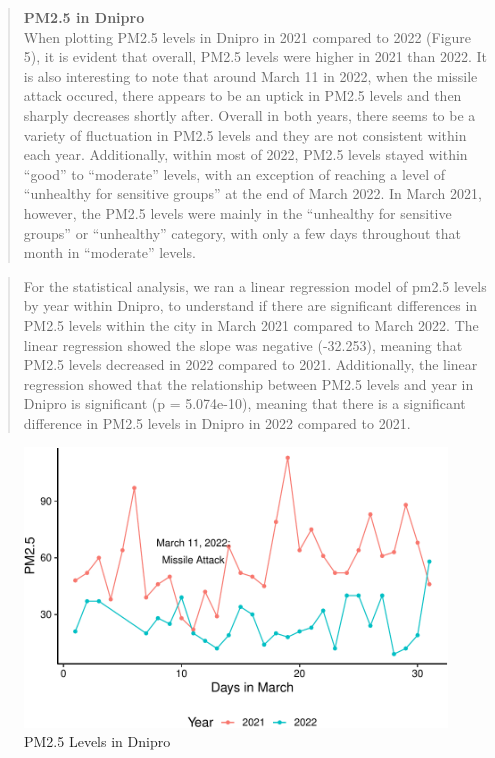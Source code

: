 \documentclass[
  12pt,
]{article}
\begin{document}
\begin{quote}
\textbf{PM2.5 in Dnipro}\\
When plotting PM2.5 levels in Dnipro in 2021 compared to 2022 (Figure
5), it is evident that overall, PM2.5 levels were higher in 2021 than
2022. It is also interesting to note that around March 11 in 2022, when
the missile attack occured, there appears to be an uptick in PM2.5
levels and then sharply decreases shortly after. Overall in both years,
there seems to be a variety of fluctuation in PM2.5 levels and they are
not consistent within each year. Additionally, within most of 2022,
PM2.5 levels stayed within ``good'' to ``moderate'' levels, with an
exception of reaching a level of ``unhealthy for sensitive groups'' at
the end of March 2022. In March 2021, however, the PM2.5 levels were
mainly in the ``unhealthy for sensitive groups'' or ``unhealthy''
category, with only a few days throughout that month in ``moderate''
levels.
\end{quote}

\begin{quote}
For the statistical analysis, we ran a linear regression model of pm2.5
levels by year within Dnipro, to understand if there are significant
differences in PM2.5 levels within the city in March 2021 compared to
March 2022. The linear regression showed the slope was negative
(-32.253), meaning that PM2.5 levels decreased in 2022 compared to 2021.
Additionally, the linear regression showed that the relationship between
PM2.5 levels and year in Dnipro is significant (p = 5.074e-10), meaning
that there is a significant difference in PM2.5 levels in Dnipro in 2022
compared to 2021.
\end{quote}

\begin{figure}
\centering
\includegraphics{Fontanie_Gordon_Weinberg_Project_files/figure-latex/Visualizing PM25 in Dnipro-1.pdf}
\caption{PM2.5 Levels in Dnipro}
\end{figure}
\end{document}

